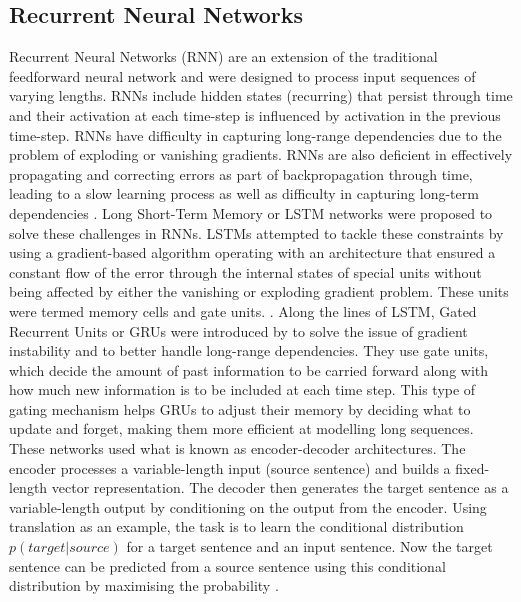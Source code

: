 \subsection{Recurrent Neural Networks}
Recurrent Neural Networks (RNN) are an extension of the traditional feedforward neural network and were designed to process input sequences of varying lengths. RNNs include hidden states (recurring) that persist through time and their activation at each time-step is influenced by activation in the previous time-step. RNNs have difficulty in capturing long-range dependencies due to the problem of exploding or vanishing gradients. RNNs are also deficient in effectively propagating and correcting errors as part of backpropagation through time, leading to a slow learning process as well as difficulty in capturing long-term dependencies \cite{chungEmpiricalEvaluationGated2014}. Long Short-Term Memory or LSTM networks were proposed to solve these challenges in RNNs. LSTMs attempted to tackle these constraints by using a gradient-based algorithm operating with an architecture that ensured a constant flow of the error through the internal states of special units without being affected by either the vanishing or exploding gradient problem. These units were termed memory cells and gate units. \cite{hochreiterLongShortTermMemory1997}. Along the lines of LSTM, Gated Recurrent Units or GRUs were introduced by \cite{choPropertiesNeuralMachine2014} to solve the issue of gradient instability and to better handle long-range dependencies. They use gate units, which decide the amount of past information to be carried forward along with how much new information is to be included at each time step. This type of gating mechanism helps GRUs to adjust their memory by deciding what to update and forget, making them more efficient at modelling long sequences.\\

These networks used what is known as encoder-decoder architectures. The encoder processes a variable-length input (source sentence) and builds a ﬁxed-length vector representation. The decoder then generates the target sentence as a variable-length output by conditioning on the output from the encoder. Using translation as an example, the task is to learn the conditional distribution $p(target | source)$ for a target sentence and an input sentence. Now the target sentence can be predicted from a source sentence using this conditional distribution by maximising the probability \cite{choPropertiesNeuralMachine2014}.\\

